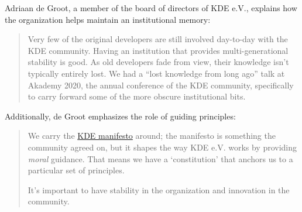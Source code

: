 \begin{kaobox}[frametitle=The role of KDE e.V. in maintaining institutional memory for the KDE community]

Adriaan de Groot, a member of the board of directors of KDE e.V., explains how the organization helps maintain an institutional memory:

\begin{quote}

Very few of the original developers are still involved day-to-day with the KDE community.  Having an institution that provides multi-generational stability is good.  As old developers fade from view, their knowledge isn't typically entirely lost.  We had a ``lost knowledge from long ago'' talk at Akademy 2020, the annual conference of the KDE community, specifically to carry forward some of the more obscure institutional bits.

\end{quote}

Additionally, de Groot emphasizes the role of guiding principles:

\begin{quote}

We carry the \href{https://manifesto.kde.org/}{KDE manifesto} around; the manifesto is something the community agreed on, but it shapes the way KDE e.V. works by providing \textit{moral} guidance.  That means we have a `constitution' that anchors us to a particular
set of principles.

It's important to have stability in the organization and innovation in the community.

\end{quote}

\end{kaobox}

